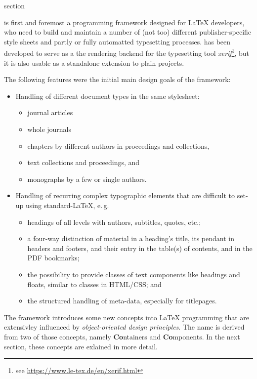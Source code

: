 \begin{heading}{section}
\end{heading}

{\CoCoTeX} is first and foremost a programming framework
designed for {\LaTeX} developers, who need to build and
maintain a number of (not too) different publisher-specific style
sheets and partly or fully automatted typesetting
processes. {\CoCoTeX} has been developed to serve as a the
rendering backend for the typesetting tool
\textit{xerif}\footnote{see
  \url{https://www.le-tex.de/en/xerif.html}}, but it is also usable as
a standalone extension to plain {\LaTeXe} projects.

The following features were the initial main design goals of the
{\CoCoTeX} framework:
\begin{itemize}
\item Handling of different document types in the same
  stylesheet:
  \begin{itemize}
  \item journal articles
  \item whole journals
  \item chapters by different authors in proceedings and collections,
  \item text collections and proceedings, and
  \item monographs by a few or single authors.
  \end{itemize}
\item Handling of recurring complex typographic elements that
  are difficult to set-up using standard-\LaTeX, e.\,g.
  \begin{itemize}
  \item headings of all levels with authors,
    subtitles, quotes, etc.;
  \item a four-way distinction of material in a heading's
    title, its pendant in headers and
    footers, and their entry in the table(s) of
      contents, and in the PDF bookmarks;
  \item the possibility to provide classes of text components
    like headings and floats, similar to classes in
    HTML/CSS; and
  \item the structured handling of meta-data, especially for
    titlepages.
  \end{itemize}
\end{itemize}

The framework introduces some new concepts into {\LaTeX} programming
that are extensivley influenced by \textit{object-oriented design
  principles}.  The name {\CoCoTeX} is derived from two of those
concepts, namely \textbf{Co}ntainers and \textbf{Co}mponents. In the
next section, these concepts are exlained in more detail.

